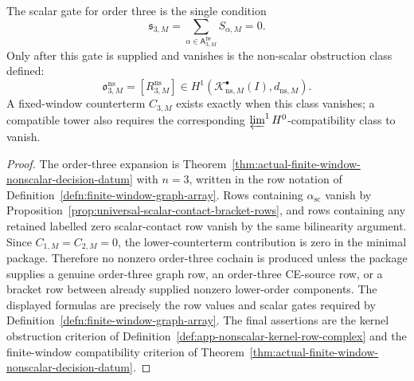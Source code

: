 \begin{prop}
  The scalar gate for order three is the single condition
  \[
    \mathfrak s_{3,M}
      =
    \sum_{\alpha\in\mathsf A^{\mathrm{fw}}_{3,M}}S_{\alpha,M}=0.
  \]
  Only after this gate is supplied and vanishes is the non-scalar obstruction
  class defined:
  \[
    \mathfrak o^{\mathrm{ns}}_{3,M}
      =
    [R^{\mathrm{ns}}_{3,M}]
    \in H^1\!\left(
      \mathcal K^\bullet_{\mathrm{ns},M}(I),d_{\mathrm{ns},M}
    \right).
  \]
  A fixed-window counterterm \(C_{3,M}\) exists exactly when this class
  vanishes; a compatible tower also requires the corresponding
  \(\varprojlim^1 H^0\)-compatibility class to vanish.
\end{prop}

\begin{proof}
  The order-three expansion is
  Theorem~\ref{thm:actual-finite-window-nonscalar-decision-datum} with
  \(n=3\), written in the row notation of
  Definition~\ref{defn:finite-window-graph-array}.  Rows containing
  \(\alpha_{\mathrm{sc}}\) vanish by
  Proposition~\ref{prop:universal-scalar-contact-bracket-rows}, and rows
  containing any retained labelled zero scalar-contact row vanish by the same
  bilinearity argument.  Since \(C_{1,M}=C_{2,M}=0\), the lower-counterterm
  contribution is zero in the minimal package.  Therefore no nonzero
  order-three cochain is produced unless the package supplies a genuine
  order-three graph row, an order-three CE-source row, or a bracket row between
  already supplied nonzero lower-order components.  The displayed formulas are
  precisely the row values and scalar gates required by
  Definition~\ref{defn:finite-window-graph-array}.  The final assertions are
  the kernel obstruction criterion of
  Definition~\ref{def:app-nonscalar-kernel-row-complex} and the finite-window
  compatibility criterion of
  Theorem~\ref{thm:actual-finite-window-nonscalar-decision-datum}.
\end{proof}

